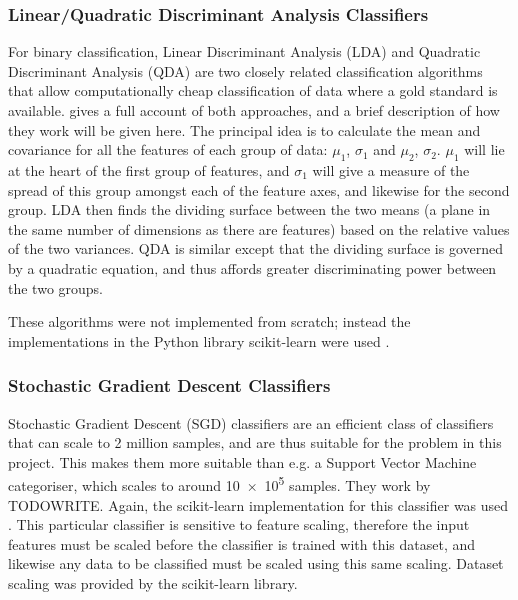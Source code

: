 \documentclass[pdftex,12pt,a4paper]{report}
\begin{document}

\subsubsection{Linear/Quadratic Discriminant Analysis Classifiers}

For binary classification, Linear Discriminant Analysis (LDA) and Quadratic Discriminant Analysis
(QDA) are two closely related classification algorithms that allow computationally cheap
classification of data where a gold standard is available. \textcite{TODOCITE} gives a full account of
both approaches, and a brief description of how they work will be given here. The principal idea is
to calculate the mean and covariance for all the features of each group of data: $\mu_1$, $\sigma_1$
and $\mu_2$, $\sigma_2$. $\mu_1$ will lie at the heart of the first group of features, and
$\sigma_1$ will give a measure of the spread of this group amongst each of the feature axes, and
likewise for the second group. LDA then finds the dividing surface between the two means (a plane in
the same number of dimensions as there are features) based on the relative values of the two
variances. QDA is similar except that the dividing surface is governed by a quadratic equation, and
thus affords greater discriminating power between the two groups.

These algorithms were not implemented from scratch; instead the implementations in the Python
library scikit-learn were used \parencite{scikitLearn2011}.

\subsubsection{Stochastic Gradient Descent Classifiers}
Stochastic Gradient Descent (SGD) classifiers are an efficient class of classifiers that can scale
to 2 million samples, and are thus suitable for the problem in this project. This makes them more
suitable than e.g. a Support Vector Machine categoriser, which scales to around \SI{10e5}{} samples.
They work by TODOWRITE.
Again, the scikit-learn implementation for this classifier was used \parencite{scikitLearn2011}.
This particular classifier is sensitive to feature scaling, therefore the input features must be
scaled before the classifier is trained with this dataset, and likewise any data to be classified
must be scaled using this same scaling. Dataset scaling was provided by the scikit-learn library.
\end{document}
